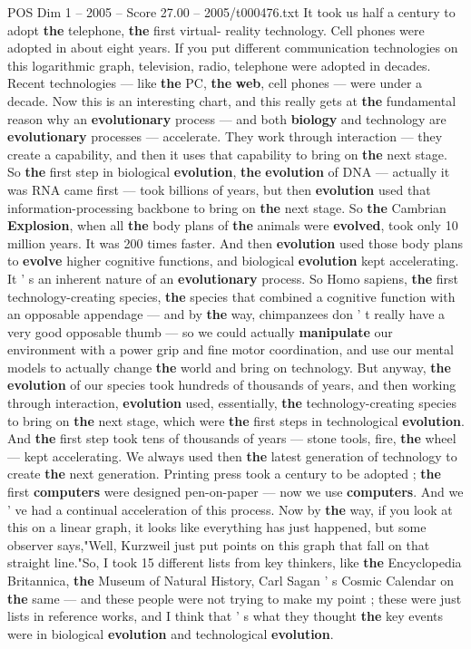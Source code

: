 \begin{textsample}{POS Dim 1 – 2005 – Score 27.00 – 2005/t000476.txt}
It took us half a century to adopt \textbf{the} telephone, \textbf{the} first virtual- reality technology.
Cell phones were adopted in about eight years.
If you put different communication technologies on this logarithmic graph, television, radio, telephone were adopted in decades.
Recent technologies — like \textbf{the} PC, \textbf{the} \textbf{web}, cell phones — were under a decade.
Now this is an interesting chart, and this really gets at \textbf{the} fundamental reason why an \textbf{evolutionary} process — and both \textbf{biology} and technology are \textbf{evolutionary} processes — accelerate.
They work through interaction — they create a capability, and then it uses that capability to bring on \textbf{the} next stage.
So \textbf{the} first step in biological \textbf{evolution}, \textbf{the} \textbf{evolution} of DNA — actually it was RNA came first — took billions of years, but then \textbf{evolution} used that information-processing backbone to bring on \textbf{the} next stage.
So \textbf{the} Cambrian \textbf{Explosion}, when all \textbf{the} body plans of \textbf{the} animals were \textbf{evolved}, took only 10 million years.
It was 200 times faster.
And then \textbf{evolution} used those body plans to \textbf{evolve} higher cognitive functions, and biological \textbf{evolution} kept accelerating.
It ' s an inherent nature of an \textbf{evolutionary} process.
So Homo sapiens, \textbf{the} first technology-creating species, \textbf{the} species that combined a cognitive function with an opposable appendage — and by \textbf{the} way, chimpanzees don ' t really have a very good opposable thumb — so we could actually \textbf{manipulate} our environment with a power grip and fine motor coordination, and use our mental models to actually change \textbf{the} world and bring on technology.
But anyway, \textbf{the} \textbf{evolution} of our species took hundreds of thousands of years, and then working through interaction, \textbf{evolution} used, essentially, \textbf{the} technology-creating species to bring on \textbf{the} next stage, which were \textbf{the} first steps in technological \textbf{evolution}.
And \textbf{the} first step took tens of thousands of years — stone tools, fire, \textbf{the} wheel — kept accelerating.
We always used then \textbf{the} latest generation of technology to create \textbf{the} next generation.
Printing press took a century to be adopted ; \textbf{the} first \textbf{computers} were designed pen-on-paper — now we use \textbf{computers}.
And we ' ve had a continual acceleration of this process.
Now by \textbf{the} way, if you look at this on a linear graph, it looks like everything has just happened, but some observer says,"Well, Kurzweil just put points on this graph that fall on that straight line."So, I took 15 different lists from key thinkers, like \textbf{the} Encyclopedia Britannica, \textbf{the} Museum of Natural History, Carl Sagan ' s Cosmic Calendar on \textbf{the} same — and these people were not trying to make my point ; these were just lists in reference works, and I think that ' s what they thought \textbf{the} key events were in biological \textbf{evolution} and technological \textbf{evolution}.

\end{textsample}
